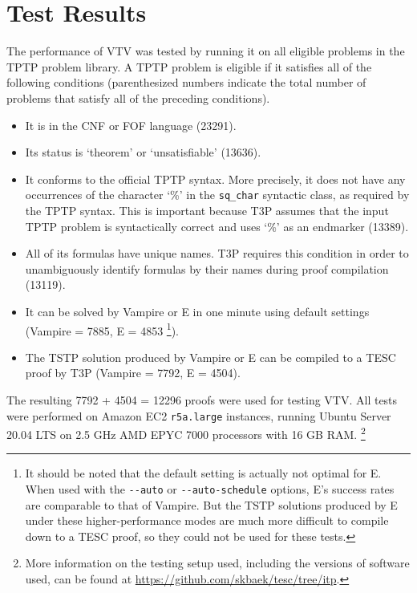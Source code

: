 \documentclass[12pt]{article}
\begin{document}
\section{Test Results} \label{sec:test-results}

The performance of VTV was tested by running it on all eligible problems 
in the TPTP \cite{sutcliffe2009tptp} problem library. A TPTP problem is eligible if it 
satisfies all of the following conditions (parenthesized numbers indicate 
the total number of problems that satisfy all of the preceding conditions).
\begin{itemize}
  \item It is in the CNF or FOF language (23291). 
  \item Its status is `theorem' or `unsatisfiable' (13636).
  \item It conforms to the official TPTP syntax. More precisely, 
    it does not have any occurrences of the character `\%' in the 
    \verb|sq_char| syntactic class, as required by the TPTP syntax.
    This is important because T3P assumes that the input TPTP problem 
    is syntactically correct and uses `\%' as an endmarker (13389).
  \item All of its formulas have unique names. T3P requires this condition 
    in order to unambiguously identify formulas by their names during 
    proof compilation (13119).
  \item It can be solved by Vampire \cite{riazanov2002design} or E \cite{schulz2002brainiac} 
      in one minute using default settings (Vampire = 7885, E = 4853 \footnote{
      It should be noted that the default setting is actually not 
      optimal for E. When used with the \verb|--auto| or \verb|--auto-schedule|
      options, E's success rates are comparable to that of Vampire. 
      But the TSTP solutions produced by E under these higher-performance modes 
      are much more difficult to compile down to a TESC proof, so they 
      could not be used for these tests.
    }).
  \item The TSTP solution produced by Vampire or E can be compiled to 
    a TESC proof by T3P (Vampire = 7792, E = 4504).
\end{itemize}
The resulting 7792 + 4504 = 12296 proofs were used for testing VTV.
All tests were performed on Amazon EC2 \texttt{r5a.large} instances, 
running Ubuntu Server 20.04 LTS on 2.5 GHz AMD EPYC 7000 processors with 
16 GB RAM. 
\footnote{
  More information on the testing setup used, including the versions of 
  software used, can be found at \url{https://github.com/skbaek/tesc/tree/itp}.
}
\end{document}
